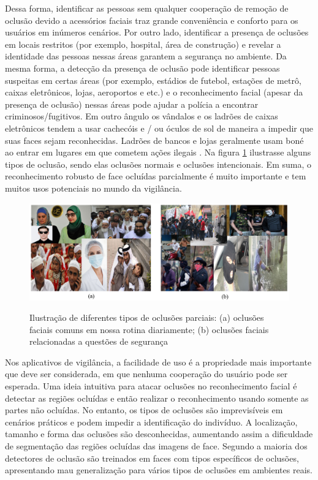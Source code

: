 Dessa forma, identificar as pessoas sem qualquer cooperação de remoção de oclusão devido a acessórios faciais traz grande conveniência e conforto para os usuários em inúmeros cenários. Por outro lado, identificar a presença de oclusões em locais restritos (por exemplo, hospital, área de construção) e revelar a identidade das pessoas nessas áreas garantem a segurança no ambiente. Da mesma forma, a detecção da presença de oclusão pode identificar pessoas suspeitas em certas áreas (por exemplo, estádios de futebol, estações de metrô, caixas eletrônicos, lojas, aeroportos e etc.) e o reconhecimento facial (apesar da presença de oclusão) nessas áreas pode ajudar a polícia a encontrar criminosos/fugitivos. Em outro ângulo  os vândalos e os ladrões de caixas eletrônicos tendem a usar cachecóis e / ou óculos de sol de maneira a impedir que suas faces sejam reconhecidas. Ladrões de bancos e lojas geralmente usam boné ao entrar em lugares em que cometem ações ilegais \cite{[2]zhang2016face}. Na figura \ref{fig:oclusao1} ilustrasse alguns tipos de oclusão, sendo elas oclusões normais e oclusões intencionais.  Em suma, o reconhecimento robusto de face ocluídas parcialmente é muito importante e tem muitos usos potenciais no mundo da vigilância.

\begin{figure}[H]
\centering
\caption{Ilustração de diferentes tipos de oclusões parciais: (a) oclusões faciais comuns em nossa rotina diariamente; (b) oclusões faciais relacionadas a questões de segurança}
\includegraphics[scale = 0.59]{imgs/varias_oclusoes.png}
\label{fig:oclusao1}
\end{figure}

Nos aplicativos de vigilância, a facilidade de uso é a propriedade mais importante que deve ser considerada, em que nenhuma cooperação do usuário pode ser esperada. Uma ideia intuitiva para atacar oclusões no reconhecimento facial é detectar as regiões ocluídas e então realizar o reconhecimento usando somente as partes não ocluídas. No entanto, os tipos de oclusões são imprevisíveis em cenários práticos e podem impedir a identificação do indivíduo. A localização, tamanho e forma das oclusões são desconhecidas, aumentando assim a dificuldade de segmentação das regiões ocluídas das imagens de face. Segundo  a maioria dos detectores de oclusão são treinados em faces com tipos específicos de oclusões, apresentando mau generalização para vários tipos de oclusões em ambientes reais. 


